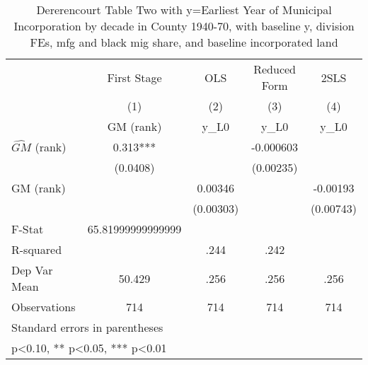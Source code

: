 \begin{table}[htbp]\centering
\def\sym#1{\ifmmode^{#1}\else\(^{#1}\)\fi}
\caption{Dererencourt Table Two with y=Earliest Year of Municipal Incorporation by decade in County 1940-70, with baseline y, division FEs, mfg and black mig share, and baseline incorporated land}
\begin{tabular}{l*{4}{c}}
\toprule
                    & First Stage   &         OLS   &Reduced Form   &        2SLS   \\
                    &\multicolumn{1}{c}{(1)}&\multicolumn{1}{c}{(2)}&\multicolumn{1}{c}{(3)}&\multicolumn{1}{c}{(4)}\\
                    &\multicolumn{1}{c}{GM  (rank)}&\multicolumn{1}{c}{y\_L0}&\multicolumn{1}{c}{y\_L0}&\multicolumn{1}{c}{y\_L0}\\
\midrule
$\hat{GM}$ (rank)   &       0.313***&               &   -0.000603   &               \\
                    &    (0.0408)   &               &   (0.00235)   &               \\
\addlinespace
GM  (rank)          &               &     0.00346   &               &    -0.00193   \\
                    &               &   (0.00303)   &               &   (0.00743)   \\
\midrule
F-Stat              &65.81999999999999   &               &               &               \\
R-squared           &               &        .244   &        .242   &               \\
Dep Var Mean        &      50.429   &        .256   &        .256   &        .256   \\
Observations        &         714   &         714   &         714   &         714   \\
\bottomrule
\multicolumn{5}{l}{\footnotesize Standard errors in parentheses}\\
\multicolumn{5}{l}{\footnotesize * p<0.10, ** p<0.05, *** p<0.01}\\
\end{tabular}
\end{table}
